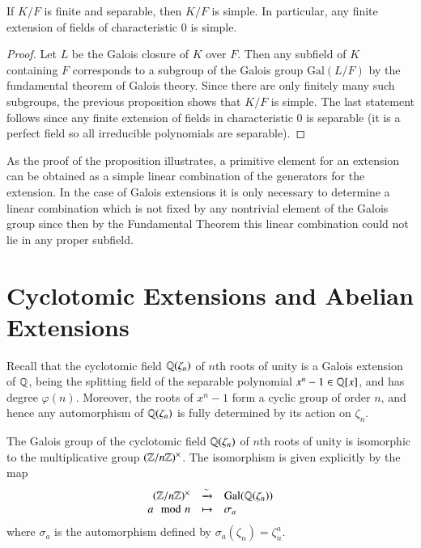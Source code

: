 \documentclass[12pt, a4paper, oneside, openright, titlepage]{book}
\begin{document}
\begin{thm}
    If $K/F$ is finite and separable, then $K/F$ is simple. In particular, any finite extension of fields of characteristic $0$ is simple.
\end{thm}
\begin{proof}
    Let $L$ be the Galois closure of $K$ over $F$. Then any subfield of $K$ containing $F$ corresponds to a subgroup of the Galois group $\text{Gal}(L/F)$ by the fundamental theorem of Galois theory. Since there are only finitely many such subgroups, the previous proposition shows that $K/F$ is simple. The last statement follows since any finite extension of fields in characteristic $0$ is separable (it is a perfect field so all irreducible polynomials are separable).
\end{proof}

As the proof of the proposition illustrates, a primitive element for an extension can be obtained as a simple linear combination of the generators for the extension. In the case of Galois extensions it is only necessary to determine a linear combination which is not fixed by any nontrivial element of the Galois group since then by the Fundamental Theorem this linear combination could not lie in any proper subfield. 



\section{\textsection Cyclotomic Extensions and Abelian Extensions}

Recall that the cyclotomic field $\mathbb Q(\zeta_n)$ of $n$th roots of unity is a Galois extension of $\mathbb Q$, being the splitting field of the separable polynomial $x^n-1 \in \mathbb Q[x]$, and has degree $\varphi(n)$. Moreover, the roots of $x^n-1$ form a cyclic group of order $n$, and hence any automorphism of $\mathbb Q(\zeta_n)$ is fully determined by its action on $\zeta_n$. 

\begin{thm}
    The Galois group of the cyclotomic field $\mathbb Q(\zeta_n)$ of $n$th roots of unity is isomorphic to the multiplicative group $(\mathbb Z/n\mathbb Z)^{\times}$. The isomorphism is given explicitly by the map \begin{equation*}
        \begin{array}{rcl} (\mathbb Z/n\mathbb Z)^{\times} & \xrightarrow{\sim} & \text{Gal}(\mathbb Q(\zeta_n)) \\ a\mod n& \mapsto &\sigma_a \end{array}
    \end{equation*}
    where $\sigma_a$ is the automorphism defined by $\sigma_a(\zeta_n) = \zeta_n^a$.
\end{thm}
\end{document}
